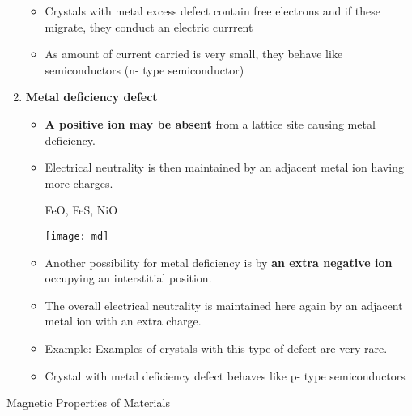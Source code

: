 \begin{enumerate}
\begin{itemize}
		\item Crystals with metal excess defect contain free electrons and if these migrate, they conduct an electric currrent 
		\item As amount of current carried is very small, they behave like semiconductors (n- type semiconductor)
	\end{itemize}
	\item \textbf{Metal deficiency defect}
	\begin{itemize}
		\item \textbf{A positive ion may be absent} from a lattice site causing metal deficiency. 
		\item Electrical neutrality is then maintained by an adjacent metal ion having more charges. 
		\begin{example}
			FeO, FeS, NiO
		\end{example}
		\begin{minipage}{0.95\textwidth}
			\centering
			\texttt{[image: md]}
		\end{minipage}
		  \item Another possibility for metal deficiency is by \textbf{an extra negative ion} occupying an interstitial position.
		\item   The overall electrical neutrality is maintained here again by an adjacent metal ion with an extra charge. 
		\item Example: Examples of crystals with this type of defect are very rare.
		\item Crystal with metal deficiency defect behaves like p- type semiconductors
	\end{itemize}
\end{enumerate}
\newpage
\begin{abox}
	Magnetic Properties of Materials
\end{abox}	

